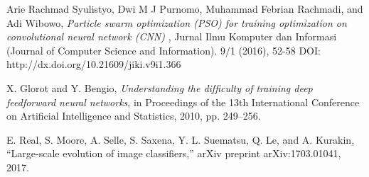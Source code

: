 \documentclass[conference]{IEEEtran}
\begin{document}
\begin{thebibliography}{}
Arie Rachmad Syulistyo, Dwi M J Purnomo, Muhammad Febrian Rachmadi, and Adi Wibowo, \emph{Particle swarm optimization (PSO) for training optimization on convolutional neural network (CNN) }, Jurnal Ilmu Komputer dan Informasi (Journal of Computer Science and Information). 9/1 (2016), 52-58 DOI: http://dx.doi.org/10.21609/jiki.v9i1.366

X. Glorot and Y. Bengio, \emph{Understanding the difﬁculty of training deep feedforward neural networks}, in Proceedings of the 13th International Conference on Artiﬁcial Intelligence and Statistics, 2010, pp. 249–256. 

E. Real, S. Moore, A. Selle, S. Saxena, Y. L. Suematsu, Q. Le, and A. Kurakin, “Large-scale evolution of image classiﬁers,” arXiv preprint arXiv:1703.01041, 2017. 

\end{thebibliography}




\end{document}
